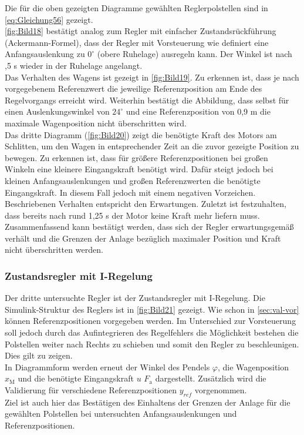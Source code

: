 \newpage
Die für die oben gezeigten Diagramme gewählten Reglerpolstellen sind in \autoref{eq:Gleichung56} gezeigt. \\
\newline
\autoref{fig:Bild18} bestätigt analog zum Regler mit einfacher Zustandsrückführung (Ackermann-Formel), dass der Regler mit Vorsteuerung wie definiert eine Anfangsauslenkung zu $0^\circ$ (obere Ruhelage) ausregeln kann. Der Winkel ist nach ,5 s wieder in der Ruhelage angelangt. \\
\newline
Das Verhalten des Wagens ist gezeigt in \autoref{fig:Bild19}. Zu erkennen ist, dass je nach vorgegebenem Referenzwert die jeweilige Referenzposition am Ende des Regelvorgangs erreicht wird. Weiterhin bestätigt die Abbildung, dass selbst für einen Auslenkungswinkel von $24^\circ$ und eine Referenzposition von 0,9 m die maximale Wagenposition nicht überschritten wird. \\
\newline
Das dritte Diagramm (\autoref{fig:Bild20}) zeigt die benötigte Kraft des Motors am Schlitten, um den Wagen in entsprechender Zeit an die zuvor gezeigte Position zu bewegen. Zu erkennen ist, dass für größere Referenzpositionen bei großen Winkeln eine kleinere Eingangskraft benötigt wird. Dafür steigt jedoch bei kleinen Anfangsauslenkungen und großen Referenzwerten die benötigte Eingangskraft. In diesem Fall jedoch mit einem negativen Vorzeichen. Beschriebenen Verhalten entspricht den Erwartungen. Zuletzt ist festzuhalten, dass bereits nach rund 1,25 s der Motor keine Kraft mehr liefern muss.\\
\newline
Zusammenfassend kann bestätigt werden, dass sich der Regler erwartungsgemäß verhält und die Grenzen der Anlage bezüglich maximaler Position und Kraft nicht überschritten werden.

\subsubsection{Zustandsregler mit I-Regelung} \label{sec:val_i_regler}

Der dritte untersuchte Regler ist der Zustandsregler mit I-Regelung. Die Simulink-Struktur des Reglers ist in \autoref{fig:Bild21} gezeigt. Wie schon in \autoref{sec:val-vor} können Referenzpositionen vorgegeben werden. Im Unterschied zur Vorsteuerung soll jedoch durch das Aufintegrieren des Regelfehlers die Möglichkeit bestehen die Polstellen weiter nach Rechts zu schieben und somit den Regler zu beschleunigen. Dies gilt zu zeigen. \\
In Diagrammform werden erneut der Winkel des Pendels $\varphi$, die Wagenposition $x_{\mathrm{M}}$ und die benötigte Eingangskraft $u$ \bzw $F_{\mathrm{a}}$ dargestellt. Zusätzlich wird die Validierung für verschiedene Referenzpositionen $y_{ref}$ vorgenommen. \\
Ziel ist auch hier das Bestätigen des Einhaltens der Grenzen der Anlage für die gewählten Polstellen bei untersuchten Anfangsauslenkungen und Referenzpositionen. 


